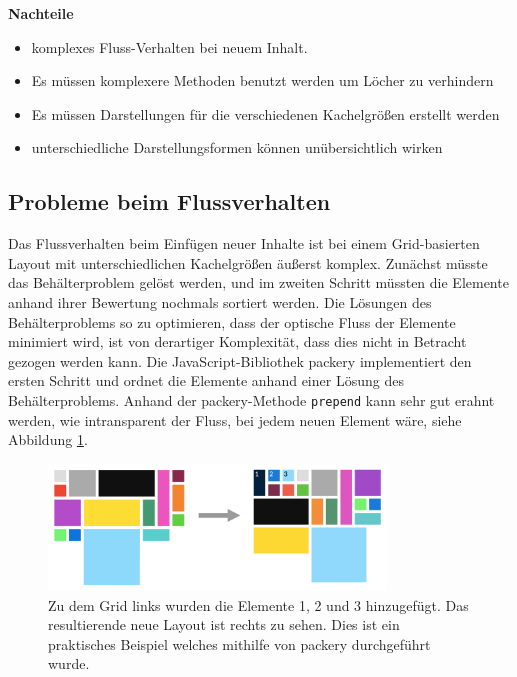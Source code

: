 \documentclass[12pt,twoside]{book}
\begin{document}
\begin{itemize}
  \textbf{Nachteile}\\
  \begin{itemize}
    \item komplexes Fluss-Verhalten bei neuem Inhalt.
    \item Es müssen komplexere Methoden benutzt werden um Löcher zu verhindern
    \item Es müssen Darstellungen für die verschiedenen Kachelgrößen erstellt werden
    \item unterschiedliche Darstellungsformen können unübersichtlich wirken
  \end{itemize}

\end{itemize}

  \subsection{Probleme beim Flussverhalten}
  Das Flussverhalten beim Einfügen neuer Inhalte ist bei einem Grid-basierten Layout mit unterschiedlichen Kachelgrößen äußerst komplex. Zunächst müsste das Behälterproblem gelöst werden, und im zweiten Schritt müssten die Elemente anhand ihrer Bewertung nochmals sortiert werden. Die Lösungen des Behälterproblems so zu optimieren, dass der optische Fluss der Elemente minimiert wird, ist von derartiger Komplexität, dass dies nicht in Betracht gezogen werden kann. Die JavaScript-Bibliothek packery \cite{packery} implementiert den ersten Schritt und ordnet die Elemente anhand einer Lösung des Behälterproblems. Anhand der packery-Methode \texttt{prepend} kann sehr gut erahnt werden, wie intransparent der Fluss, bei jedem neuen Element wäre, siehe Abbildung \ref{fig:grid_flow}.

  \begin{figure}[htbp]
    \centering
    \includegraphics[width=0.8\textwidth]{images/grid_flow.png}
    \caption{Zu dem Grid links wurden die Elemente 1, 2 und 3 hinzugefügt. Das resultierende neue Layout ist rechts zu sehen. Dies ist ein praktisches Beispiel welches mithilfe von packery durchgeführt wurde.}
    \label{fig:grid_flow}
  \end{figure}
\end{document}
